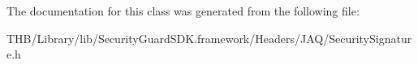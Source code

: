 The documentation for this class was generated from the following file\+:\begin{DoxyCompactItemize}
\item 
T\+H\+B/\+Library/lib/\+Security\+Guard\+S\+D\+K.\+framework/\+Headers/\+J\+A\+Q/Security\+Signature.\+h\end{DoxyCompactItemize}

